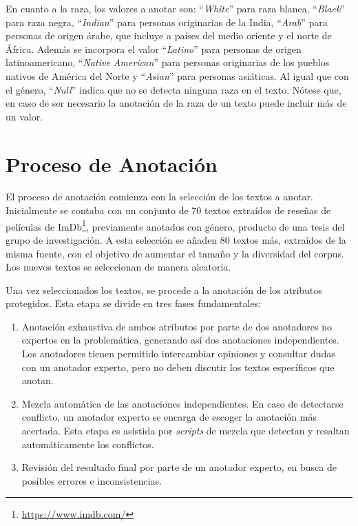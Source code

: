 En cuanto a la raza, los valores a anotar son: ``\emph{White}'' para raza blanca, ``\emph{Black}'' para raza negra, ``\emph{Indian}'' para 
personas originarias de la India, ``\emph{Arab}'' para personas de origen \'arabe, que incluye a pa\'ises del medio oriente y el norte de 
\'Africa. Adem\'as se incorpora el valor ``\emph{Latino}'' para personas de origen latinoamericano, ``\emph{Native American}'' para personas 
originarias de los pueblos nativos de Am\'erica del Norte y ``\emph{Asian}'' para personas asi\'aticas. Al igual que con el g\'enero, 
``\emph{Null}'' indica que no se detecta ninguna raza en el texto. N\'otese que, en caso de ser necesario la anotaci\'on de la raza de un 
texto puede incluir m\'as de un valor.

\section{Proceso de Anotaci\'on}\label{section:annotation_process}
El proceso de anotaci\'on comienza con la selecci\'on de los textos a anotar. Inicialmente se contaba con un conjunto de $70$ textos 
extra\'idos de rese\~nas de pel\'iculas de ImDb\footnote{\url{https://www.imdb.com/}}, previamente anotados con g\'enero, producto 
de una tesis del grupo de investigaci\'on. A esta selecci\'on se a\~naden $80$ textos m\'as, extra\'idos de la misma fuente, con el 
objetivo de aumentar el tama\~no y la diversidad del corpus. Los nuevos textos se seleccionan de manera aleatoria.

Una vez seleccionados los textos, se procede a la anotaci\'on de los atributos protegidos. Esta etapa se divide en tres fases 
fundamentales:

\begin{enumerate}
    \item Anotaci\'on exhaustiva de ambos atributos por parte de dos anotadores no expertos en la problem\'atica, generando as\'i dos 
    anotaciones independientes. Los anotadores tienen permitido intercambiar opiniones y consultar dudas con un anotador experto, 
    pero no deben discutir los textos espec\'ificos que anotan.
    \item Mezcla autom\'atica de las anotaciones independientes. En caso de detectarse conflicto, un anotador experto se encarga de 
    escoger la anotaci\'on m\'as acertada. Esta etapa es asistida por \emph{scripts} de mezcla que detectan y resaltan autom\'aticamente
    los conflictos.
    \item Revisi\'on del resultado final por parte de un anotador experto, en busca de posibles errores e inconsistencias.
\end{enumerate}

